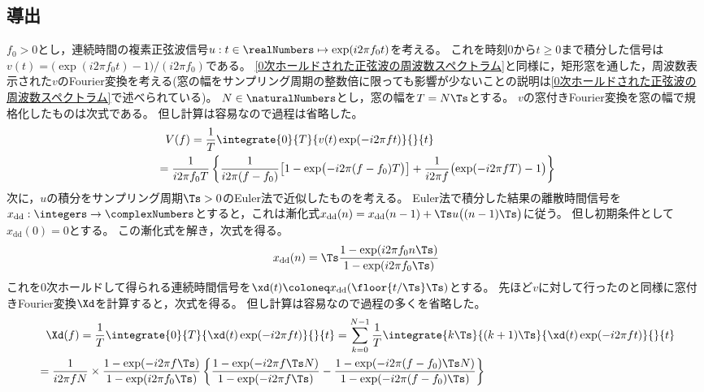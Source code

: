         \subsection{導出}
            \newcommand*{\xdd}{x_\text{dd}}
            $f_0>0$とし，連続時間の複素正弦波信号$u:t\in\realNumbers\mapsto\exp(i 2\pi f_0 t)$を考える。
            これを時刻$0$から$t\geq 0$まで積分した信号は$v(t) = \bigl(\exp(i 2\pi f_0 t)-1\bigr) / (i 2\pi f_0)$である。
            \ref{0次ホールドされた正弦波の周波数スペクトラム}と同様に，矩形窓を通した，周波数表示された$v$のFourier変換を考える(窓の幅をサンプリング周期の整数倍に限っても影響が少ないことの説明は\ref{0次ホールドされた正弦波の周波数スペクトラム}で述べられている)。
            $N\in\naturalNumbers$とし，窓の幅を$T=N\Ts$とする。
            $v$の窓付きFourier変換を窓の幅で規格化したものは次式である。
            但し計算は容易なので過程は省略した。
            \begin{align*}
                &\phantom{=} V(f) = \frac{1}{T} \integrate{0}{T}{v(t)\exp(-i 2\pi f t)}{}{t} \\
                &= \frac{1}{i 2\pi f_0 T} \left\{\frac{1}{i 2\pi (f-f_0)}\bigl[1 - \exp\bigl(-i 2\pi (f-f_0)T\bigr)\bigr] + \frac{1}{i 2\pi f}\bigl(\exp(-i 2\pi f T) - 1\bigr)\right\}
            \end{align*}
            次に，$u$の積分をサンプリング周期$\Ts>0$のEuler法で近似したものを考える。
            Euler法で積分した結果の離散時間信号を$\xdd:\integers\to\complexNumbers$とすると，これは漸化式$\xdd(n) = \xdd(n-1) + \Ts u\bigl((n-1)\Ts\bigr)$に従う。
            但し初期条件として$\xdd(0)=0$とする。
            この漸化式を解き，次式を得る。
            \[ \xdd(n) = \Ts\frac{1-\exp(i 2\pi f_0 n\Ts)}{1-\exp(i 2\pi f_0\Ts)} \]
            これを0次ホールドして得られる連続時間信号を$\xd(t) \coloneq \xdd(\floor{t/\Ts}\Ts)$とする。
            先ほど$v$に対して行ったのと同様に窓付きFourier変換$\Xd$を計算すると，次式を得る。
            但し計算は容易なので過程の多くを省略した。
            \begin{align*}
                &\phantom{=} \Xd(f) = \frac{1}{T} \integrate{0}{T}{\xd(t)\exp(-i 2\pi f t)}{}{t} = \sum_{k=0}^{N-1} \frac{1}{T} \integrate{k\Ts}{(k+1)\Ts}{\xd(t)\exp(-i 2\pi f t)}{}{t} \\
                &= \frac{1}{i 2\pi f N}\times\frac{1-\exp(-i 2\pi f\Ts)}{1-\exp(i 2\pi f_0\Ts)} \left\{\frac{1-\exp(-i 2\pi f \Ts N)}{1-\exp(-i 2\pi f \Ts)} - \frac{1-\exp(-i 2\pi (f-f_0) \Ts N)}{1-\exp(-i 2\pi (f-f_0) \Ts)}\right\}
            \end{align*}

